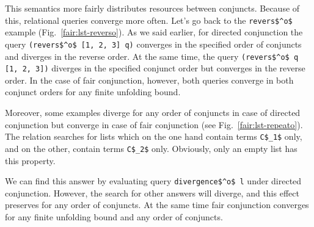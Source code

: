 This semantics more fairly distributes resources between conjuncts. Because of this, relational queries converge more often. Let's go back to the \lstinline{revers$^o$} example
(Fig.~\ref{fair:lst-reverso}). As we said earlier, for directed conjunction the query \lstinline{(revers$^o$ [1, 2, 3] q)} converges in the specified order of conjuncts and diverges
in the reverse order. At the same time, the query \lstinline{(revers$^o$ q [1, 2, 3])} diverges in the specified conjunct order but converges in the reverse order. In the case of fair conjunction,
however, both queries converge in both conjunct orders for any finite unfolding bound.

Moreover, some examples diverge for any order of conjuncts in case of directed conjunction but converge in case of fair conjunction (see Fig.~\ref{fair:lst-repeato}).
The relation searches for lists which on the one hand contain terms \lstinline{C$_1$} only, and on the other, contain terms \lstinline{C$_2$} only. Obviously, only an empty list has this property.

We can find this answer by evaluating query \lstinline{divergence$^o$ l} under directed conjunction. However, the search for other answers will diverge, and this effect preserves for any order of conjuncts. At the same time fair conjunction converges for any finite unfolding bound and any order of conjuncts.

